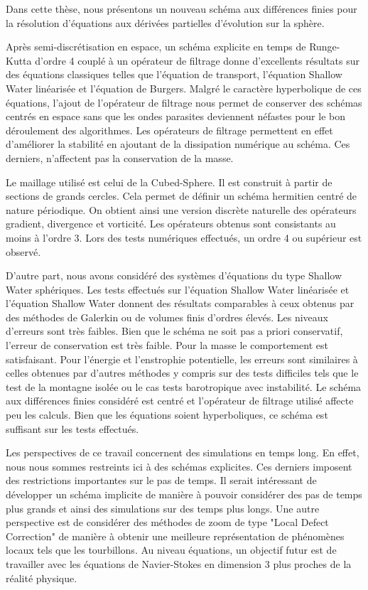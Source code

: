 
Dans cette thèse, nous présentons un nouveau schéma aux différences finies pour la résolution d'équations aux dérivées partielles d'évolution sur la sphère.

Après semi-discrétisation en espace, un schéma explicite en temps de Runge-Kutta d'ordre 4 couplé à un opérateur de filtrage donne d'excellents résultats sur des équations classiques telles que l'équation de transport, l'équation Shallow Water linéarisée et l'équation de Burgers. Malgré le caractère hyperbolique de ces équations, l'ajout de l'opérateur de filtrage nous permet de conserver des schémas centrés en espace sans que les ondes parasites deviennent néfastes pour le bon déroulement des algorithmes. Les opérateurs de filtrage permettent en effet d'améliorer la stabilité en ajoutant de la dissipation numérique au schéma. Ces derniers, n'affectent pas la conservation de la masse.

Le maillage utilisé est celui de la Cubed-Sphere. Il est construit à partir de sections de grands cercles. Cela permet de définir un schéma hermitien centré de nature périodique. On obtient ainsi une version discrète naturelle des opérateurs gradient, divergence et vorticité. Les opérateurs obtenus sont consistants au moins à l'ordre 3. Lors des tests numériques effectués, un ordre 4 ou supérieur est observé.

D'autre part, nous avons considéré des systèmes d'équations du type Shallow Water sphériques. Les tests effectués sur l'équation Shallow Water linéarisée et l'équation Shallow Water donnent des résultats comparables à ceux obtenus par des méthodes de Galerkin ou de volumes finis d'ordres élevés. Les niveaux d'erreurs sont très faibles. Bien que le schéma ne soit pas a priori conservatif, l'erreur de conservation est très faible. Pour la masse le comportement est satisfaisant. Pour l'énergie et l'enstrophie potentielle, les erreurs sont similaires à celles obtenues par d'autres méthodes y compris sur des tests difficiles tels que le test de la montagne isolée ou le cas tests barotropique avec instabilité. Le schéma aux différences finies considéré est centré et l'opérateur de filtrage utilisé affecte peu les calculs. Bien que les équations soient hyperboliques, ce schéma est suffisant sur les tests effectués.

Les perspectives de ce travail concernent des simulations en temps long. En effet, nous nous sommes restreints ici à des schémas explicites. Ces derniers imposent des restrictions importantes sur le pas de temps. Il serait intéressant de développer un schéma implicite de manière à pouvoir considérer des pas de temps plus grands et ainsi des simulations sur des temps plus longs. Une autre perspective est de considérer des méthodes de zoom de type "Local Defect Correction" de manière à obtenir une meilleure représentation de phénomènes locaux tels que les tourbillons. Au niveau équations, un objectif futur est de travailler avec les équations de Navier-Stokes en dimension 3 plus proches de la réalité physique.


